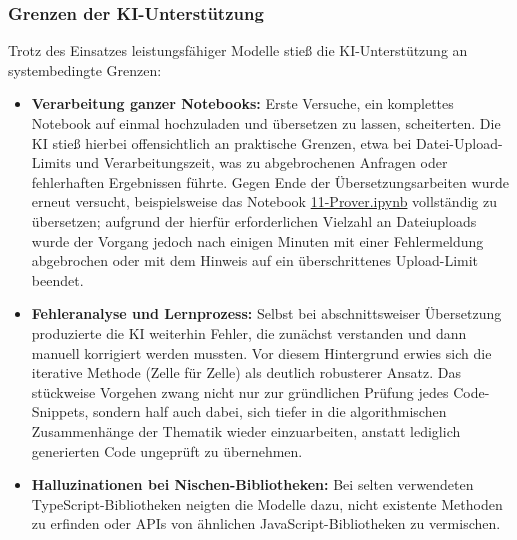 \subsubsection{Grenzen der KI-Unterstützung}
Trotz des Einsatzes leistungsfähiger Modelle stieß die KI-Unterstützung an systembedingte Grenzen:
\begin{itemize}
	\item \textbf{Verarbeitung ganzer Notebooks:} Erste Versuche, ein komplettes Notebook auf einmal hochzuladen und übersetzen zu lassen, scheiterten. Die \ac{KI} stieß hierbei offensichtlich an praktische Grenzen, etwa bei Datei-Upload-Limits und Verarbeitungszeit, was zu abgebrochenen Anfragen oder fehlerhaften Ergebnissen führte. Gegen Ende der Übersetzungsarbeiten wurde erneut versucht, beispielsweise das Notebook \href{https://github.com/zLeoll/TS-Translation-for-TheoInf/blob/main/Logic/Chapter-5/11-Prover.ipynb}{11-Prover.ipynb} vollständig zu übersetzen; aufgrund der hierfür erforderlichen Vielzahl an Dateiuploads wurde der Vorgang jedoch nach einigen Minuten mit einer Fehlermeldung abgebrochen oder mit dem Hinweis auf ein überschrittenes Upload-Limit beendet.
	\item \textbf{Fehleranalyse und Lernprozess:} Selbst bei abschnittsweiser Übersetzung produzierte die \ac{KI} weiterhin Fehler, die zunächst verstanden und dann manuell korrigiert werden mussten. Vor diesem Hintergrund erwies sich die iterative Methode (Zelle für Zelle) als deutlich robusterer Ansatz. Das stückweise Vorgehen zwang nicht nur zur gründlichen Prüfung jedes Code-Snippets, sondern half auch dabei, sich tiefer in die algorithmischen Zusammenhänge der Thematik wieder einzuarbeiten, anstatt lediglich generierten Code ungeprüft zu übernehmen.
	\item \textbf{Halluzinationen bei Nischen-Bibliotheken:} Bei selten verwendeten TypeScript-Bibliotheken neigten die Modelle dazu, nicht existente Methoden zu erfinden oder APIs von ähnlichen JavaScript-Bibliotheken zu vermischen.
\end{itemize}